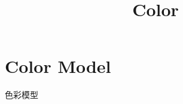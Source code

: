 \documentclass{article}
\title{Color}
\author{}
\date{}
\begin{document}
\maketitle

\tableofcontents


\section{Color Model}
色彩模型
\end{document}
